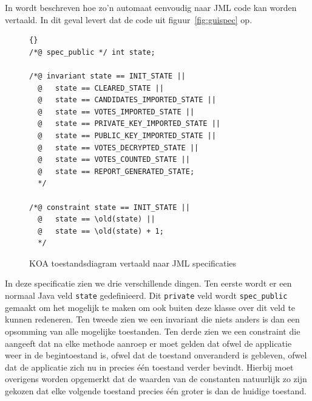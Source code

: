 \documentclass{article}
\begin{document}
In \cite{Hubbers_Oostdijk_Poll:2003sec} wordt beschreven hoe zo'n automaat 
eenvoudig naar JML code kan worden vertaald.
In dit geval levert dat de code uit figuur~\ref{fig:guispec} op.
\begin{figure}[htbp]
  \begin{center}
    \begin{lstlisting}{}
/*@ spec_public */ int state; 

/*@ invariant state == INIT_STATE ||
  @   state == CLEARED_STATE ||
  @   state == CANDIDATES_IMPORTED_STATE ||
  @   state == VOTES_IMPORTED_STATE ||
  @   state == PRIVATE_KEY_IMPORTED_STATE ||
  @   state == PUBLIC_KEY_IMPORTED_STATE ||
  @   state == VOTES_DECRYPTED_STATE ||
  @   state == VOTES_COUNTED_STATE ||
  @   state == REPORT_GENERATED_STATE;
  */

/*@ constraint state == INIT_STATE ||
  @   state == \old(state) ||
  @   state == \old(state) + 1;
  */

    \end{lstlisting}
    \caption{KOA toestandsdiagram vertaald naar JML specificaties}
    \label{fig:toestandenspec}
  \end{center}
\end{figure}
In deze specificatie zien we drie verschillende dingen. Ten eerste wordt er een
normaal Java veld \texttt{state} gedefinieerd. Dit \texttt{private} veld
wordt \texttt{spec\_public} gemaakt om het mogelijk te maken om ook buiten
deze klasse over dit veld te kunnen redeneren.
Ten tweede zien we een invariant die niets anders is dan een opsomming van alle
mogelijke toestanden.
Ten derde zien we een constraint die aangeeft dat na elke methode aanroep
er moet gelden dat ofwel de applicatie weer in de begintoestand is, ofwel dat de toestand onveranderd is gebleven, ofwel dat de applicatie zich nu in precies \'e\'en toestand verder bevindt. Hierbij moet overigens worden opgemerkt dat de
waarden van de constanten natuurlijk zo zijn gekozen dat elke volgende toestand precies \'e\'en groter is dan de huidige toestand.

\end{document}
